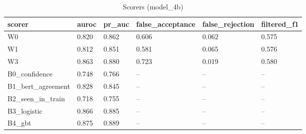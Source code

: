 \begin{table}[t]
\centering
\small
\begin{tabular}{llllll}
\hline
scorer & auroc & pr\_auc & false\_acceptance & false\_rejection & filtered\_f1 \\
\hline
W0 & 0.820 & 0.862 & 0.606 & 0.062 & 0.575 \\
W1 & 0.812 & 0.851 & 0.581 & 0.065 & 0.576 \\
W3 & 0.863 & 0.880 & 0.723 & 0.019 & 0.580 \\
B0\_confidence & 0.748 & 0.766 & -- & -- & -- \\
B1\_bert\_agreement & 0.828 & 0.845 & -- & -- & -- \\
B2\_seen\_in\_train & 0.718 & 0.755 & -- & -- & -- \\
B3\_logistic & 0.866 & 0.885 & -- & -- & -- \\
B4\_gbt & 0.875 & 0.889 & -- & -- & -- \\
\hline
\end{tabular}
\caption{Scorers (model\_4b)}
\label{tab:scorers_model_4b}
\end{table}
